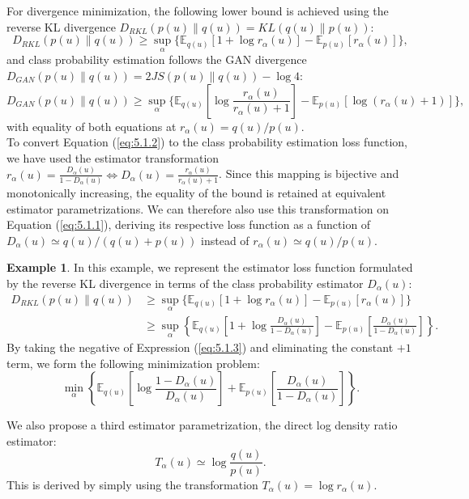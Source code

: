 \documentclass[honours,12pt, twoside]{unswthesis}
\numberwithin{equation}{section}
\theoremstyle{definition}
\newtheorem{example}[theorem]{Example}
\begin{document}
For divergence minimization, the following lower bound is achieved using the reverse KL divergence $D_{RKL}(p(u)\|q(u))=KL(q(u)\|p(u))$:
\begin{equation}\label{eq:5.1.1}
D_{RKL}(p(u)\|q(u))\geq \sup_{\alpha}\{\mathbb{E}_{q(u)}[1+\log r_\alpha(u)]-\mathbb{E}_{p(u)}[r_\alpha(u)]\},
\end{equation}
and class probability estimation follows the GAN divergence $D_{GAN}(p(u)\|q(u))=2JS(p(u)\|q(u))-\log 4$:
\begin{equation}\label{eq:5.1.2}
D_{GAN}(p(u)\|q(u))\geq \sup_\alpha\{\mathbb{E}_{q(u)}\left[\log \frac{r_\alpha(u)}{r_\alpha(u)+1}\right]-\mathbb{E}_{p(u)}[\log(r_\alpha(u)+1)]\},
\end{equation}
with equality of both equations at $r_\alpha(u)=q(u)/p(u)$.\\
To convert Equation (\ref{eq:5.1.2}) to the class probability estimation loss function, we have used the estimator transformation $r_\alpha(u)=\frac{D_\alpha(u)}{1-D_\alpha(u)}\iff D_\alpha(u)=\frac{r_\alpha(u)}{r_\alpha(u)+1}$. Since this mapping is bijective and monotonically increasing, the equality of the bound is retained at equivalent estimator parametrizations. We can therefore also use this transformation on Equation (\ref{eq:5.1.1}), deriving its respective loss function as a function of $D_\alpha(u)\simeq q(u)/(q(u)+p(u))$ instead of $r_\alpha(u)\simeq q(u)/p(u)$.
\begin{example}
In this example, we represent the estimator loss function formulated by the reverse KL divergence in terms of the class probability estimator $D_\alpha(u)$:
\begin{align}
D_{RKL}(p(u)\|q(u))&\geq \sup_{\alpha}\{\mathbb{E}_{q(u)}[1+\log r_\alpha(u)]-\mathbb{E}_{p(u)}[r_\alpha(u)]\}\nonumber\\
&\geq \sup_{\alpha}\left\lbrace\mathbb{E}_{q(u)}\left[1+\log \frac{D_\alpha(u)}{1-D_\alpha(u)}\right]-\mathbb{E}_{p(u)}\left[\frac{D_\alpha(u)}{1-D_\alpha(u)}\right]\right\rbrace. \label{eq:5.1.3}
\end{align}
By taking the negative of Expression (\ref{eq:5.1.3}) and eliminating the constant $+1$ term, we form the following minimization problem:
\[\min_\alpha \left\lbrace\mathbb{E}_{q(u)}\left[\log \frac{1-D_\alpha(u)}{D_\alpha(u)}\right]+\mathbb{E}_{p(u)}\left[\frac{D_\alpha(u)}{1-D_\alpha(u)}\right]\right\rbrace.\]
\end{example}
We also propose a third estimator parametrization, the direct log density ratio estimator:
\[T_\alpha(u)\simeq \log \frac{q(u)}{p(u)}.\]
This is derived by simply using the transformation $T_\alpha(u)=\log r_\alpha(u)$.
\end{document}
